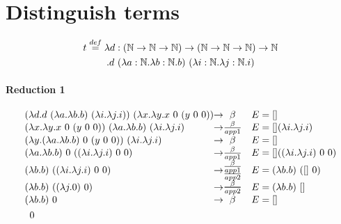 \documentclass{article}
\newcommand{\N}{\ensuremath \mathbb N}
\newcommand{\lam}[2]{\ensuremath{\lambda#1.#2}}
\begin{document}
\section{Distinguish terms}
\begin{multline*}
    t\overset{def}=\lam{d:(\N\to\N\to\N)\to(\N\to\N\to\N)\to\N\\}{d\ (\lam{a:\N}{\lam{b:\N}{b}})\ (\lam{i:\N}{\lam{j:\N}{i}})}
\end{multline*}

\paragraph{Reduction 1}
\begin{align*}
    &\begin{array}{l @{\to} c l}
        (\lam{d}{d\ (\lam{a}\lam{b}{b})\ (\lam{i}\lam{j}{i})})\ (\lam{x}\lam{y}{x\ 0\ (y\ 0\ 0)}) & \beta & E=[] \\
        (\lam{x}\lam{y}{x\ 0\ (y\ 0\ 0)})\ (\lam{a}\lam{b}{b})\ (\lam{i}\lam{j}{i}) & \frac{\beta}{app1} & E=[](\lam{i}\lam{j}{i}) \\
        (\lam{y}{(\lam{a}\lam{b}{b})\ 0\ (y\ 0\ 0)})\ (\lam{i}\lam{j}{i}) & \beta & E=[] \\
        (\lam{a}\lam{b}{b})\ 0\ ((\lam{i}\lam{j}{i})\ 0\ 0)\  & \frac\beta{app1} & E=[]((\lam{i}\lam{j}{i})\ 0\ 0) \\
        (\lam{b}{b})\ ((\lam{i}\lam{j}{i})\ 0\ 0)\  & \substack{\beta\\\hline\\app1\\\hline\\app2} & E=(\lam b b)\ ([]\ 0) \\
        (\lam{b}{b})\ ((\lam{j}{0})\ 0)\  & \substack{\beta\\\hline\\\hline\\app2} & E=(\lam b b)\ [] \\
        (\lam{b}{b})\ 0 & \beta & E= [] \\
    \end{array}\\
    &\quad 0
\end{align*}
\end{document}
